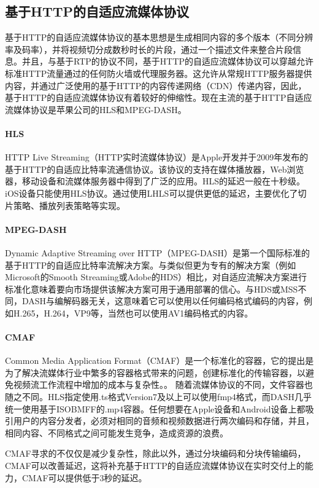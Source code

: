 \subsection{基于HTTP的自适应流媒体协议}

基于HTTP的自适应流媒体协议的基本思想是生成相同内容的多个版本（不同分辨率及码率），并将视频切分成数秒时长的片段，通过一个描述文件来整合片段信息。并且，与基于RTP的协议不同，基于HTTP的自适应流媒体协议可以穿越允许标准HTTP流量通过的任何防火墙或代理服务器。这允许从常规HTTP服务器提供内容，并通过广泛使用的基于HTTP的内容传递网络（CDN）传递内容，因此，基于HTTP的自适应流媒体协议有着较好的伸缩性。现在主流的基于HTTP自适应流媒体协议是苹果公司的HLS和MPEG-DASH。

\paragraph{HLS} HTTP Live Streaming（HTTP实时流媒体协议）是Apple开发并于2009年发布的基于HTTP的自适应比特率流通信协议。该协议的支持在媒体播放器，Web浏览器，移动设备和流媒体服务器中得到了广泛的应用。HLS的延迟一般在十秒级。iOS设备只能使用HLS协议。通过使用LHLS可以提供更低的延迟，主要优化了切片策略、播放列表策略等实现。

\paragraph{MPEG-DASH} Dynamic Adaptive Streaming over HTTP（MPEG-DASH）是第一个国际标准的基于HTTP的自适应比特率流解决方案。与类似但更为专有的解决方案（例如Microsoft的Smooth Streaming或Adobe的HDS）相比，对自适应流解决方案进行标准化意味着要向市场提供该解决方案可用于通用部署的信心。与HDS或MSS不同，DASH与编解码器无关，这意味着它可以使用以任何编码格式编码的内容，例如H.265，H.264，VP9等，当然也可以使用AV1编码格式的内容。

\paragraph{CMAF} Common Media Application Format（CMAF）是一个标准化的容器，它的提出是为了解决流媒体行业中繁多的容器格式带来的问题，创建标准化的传输容器，以避免视频流工作流程中增加的成本与复杂性。。 随着流媒体协议的不同，文件容器也随之不同。HLS指定使用.ts格式Version7及以上可以使用fmp4格式，而DASH几乎统一使用基于ISOBMFF的.mp4容器。任何想要在Apple设备和Android设备上都吸引用户的内容分发者，必须对相同的音频和视频数据进行两次编码和存储，并且，相同内容、不同格式之间可能发生竞争，造成资源的浪费。

CMAF寻求的不仅仅是减少复杂性，除此以外，通过分块编码和分块传输编码，CMAF可以改善延迟，这将补充基于HTTP的自适应流媒体协议在实时交付上的能力，CMAF可以提供低于3秒的延迟。

